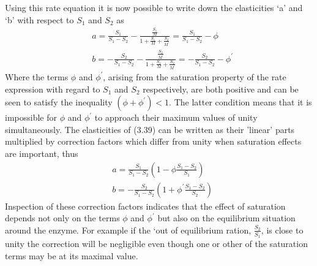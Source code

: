 Using this rate equation it is now possible to write down the elasticities `a' and `b' with respect to $S_{1}$ and $S_{2}$ as
%
\begin{equation}
\begin{aligned}
& a =\frac{S_{1}}{S_{1}-S_{2}}-\frac{\frac{S_{1}}{M}}{1+\frac{S_{1}}{M}+\frac{S_{2}}{M^{\prime}}}=\frac{S_{1}}{S_{1}-S_{2}}- \phi \\
& b =-\frac{S_{2}}{S_{1}-S_{2}}-\frac{\frac{S_{2}}{M^{\prime}}}{1+\frac{S_{1}}{M}+\frac{S_{2}}{M^{\prime}}}=-\frac{S_{2}}{S_{1}-S_{2}}-\phi^{\prime}
\end{aligned}
\label{eqn:339}
\end{equation}
%
Where the terms $\phi$ and $\phi^{\prime}$, arising from the saturation property of the rate expression with regard to $S_{1}$ and $S_{2}$ respectively, are both positive and can be seen to satisfy the inequality $\left(\phi+\phi^{\prime}\right) < 1$. The latter condition means that it is impossible for  $\phi$ and $\phi^{\prime}$  to approach
their maximum values of unity simultaneously. The elasticities of (3.39) can be written as their 'linear' parts multiplied by correction
factors which differ from unity when saturation effects are important, thus
%
\begin{equation}
\begin{aligned}
& a = \frac{S_{1}}{S_{1}-S_{2}}\left(1-\phi \frac{S_1-S_2}{S_1}\right) \\
& b = -\frac{S_{2}}{S_{1}-S_{2}}\left(1+\phi^{\prime} \frac{S_{1}-S_{2}}{S_{2}}\right)
\end{aligned}
\label{eqn:340}
\end{equation}
%
Inspection of these correction factors indicates that the effect of saturation depends not only on the terms $\phi$ and $\phi^{\prime}$ but also on the equilibrium situation around the enzyme. For example if the `out of equilibrium ration, $\frac{S_{2}}{S_{1}}$, is close to unity the correction will be negligible even though one or other of the saturation terms may be at its maximal value.

